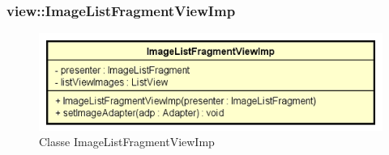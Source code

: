 \documentclass[../DefinizioneDiProdotto.tex]{subfiles}
\begin{document}
\subsubsection{view::ImageListFragmentViewImp}

    \begin{figure}[H]
        \centering
        \includegraphics{img/ImageListFragmentViewImp.png}
        \caption{Classe ImageListFragmentViewImp}\label{fig:view::ImageListFragmentViewImp} 
    \end{figure}
\end{document}
